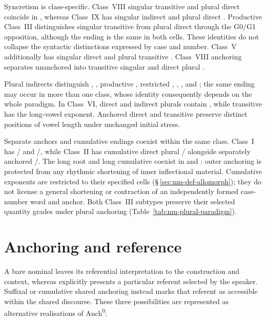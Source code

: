 Syncretism is class-specific. Class~VIII singular transitive and plural direct
coincide in , whereas Class~IX has singular indirect and plural
direct . Productive Class~III distinguishes singular transitive
 from plural direct  through the G0/G1 opposition,
although the ending is the same in both cells.
These identities do not collapse the syntactic distinctions expressed by case
and number. Class~V additionally has singular direct and plural transitive
. Class~VIII anchoring separates unanchored  into
transitive singular  and direct plural .

Plural indirects distinguish , , productive ,
restricted , ,
, and ; the same ending may occur in more than one
class, whose identity consequently depends on the whole paradigm. In
Class~VI, direct and indirect plurals contain , while transitive
 has the long-vowel exponent. Anchored direct  and
transitive  preserve distinct positions of vowel length under
unchanged initial stress.

Separate anchors and cumulative endings coexist within the same class.
Class~I has / and /, while
Class~II has cumulative direct plural / alongside
separately anchored /. The long root and long
cumulative  coexist in 
and : outer anchoring is protected from any rhythmic shortening
of inner inflectional material. Cumulative exponents are
restricted to their specified cells (§\,\ref{sec:nm-def-allomorph}); they do
not license a general shortening or contraction of an independently formed
case-number word and anchor. Both Class~III subtypes preserve their selected
quantity grades under plural anchoring (Table~\ref{tab:nm-plural-paradigm}).

\FloatBarrier

\section{Anchoring and reference}
\label{sec:nm-def}

A bare nominal leaves its referential interpretation to the construction and
context, whereas  explicitly presents a particular referent selected
by the speaker. Suffixal or cumulative shared anchoring instead marks that
referent as accessible within the shared discourse. These three possibilities
are represented as alternative realisations of Anch\textsuperscript{0}:

